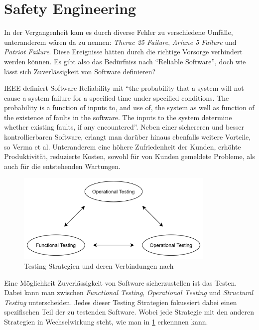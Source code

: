     \section{Safety Engineering}
        In der Vergangenheit kam es durch diverse Fehler zu verschiedene Umfälle, unteranderem wären da zu nennen:
        \textit{Therac 25 Failure}, \textit{Ariane 5 Failure} und \textit{Patriot Failure}. Diese Ereignisse hätten
        durch die richtige Vorsorge verhindert werden können.\cite[p. 185]{Verma2015} Es gibt also das Bedürfniss
        nach ``Reliable Software'', doch wie lässt sich Zuverlässigkeit von Software definieren?

        IEEE definiert Software Reliability mit ``the probability that a system will not cause a system failure
        for a specified time under specified conditions. The probability is a function of inputs to, and use of,
        the system as well as function of the existence of faults in the software. The inputs to the system
        determine whether existing faults, if any encountered''.\cite[p. 183]{Verma2015} Neben einer sichereren und
        besser kontrollierbaren Software, erlangt man darüber hinaus ebenfalls weitere Vorteile, so Verma et al.
        Unteranderem eine höhere Zufriedenheit der Kunden, erhöhte Produktivität, reduzierte Kosten, sowohl für
        von Kunden gemeldete Probleme, als auch für die entstehenden Wartungen.

        \begin{figure}[h]
            \begin{center}
                \includegraphics[width=0.85\textwidth]{figures/testing.png}
                \caption[Testing Strategies]{Testing Strategien und deren Verbindungen nach \cite{bertolino2019}}
                \label{pic:testing-strategies}
            \end{center}
        \end{figure}

        Eine Möglichkeit Zuverlässigkeit von Software sicherzustellen ist das Testen. Dabei kann man zwischen
        \textit{Functional Testing}, \textit{Operational Testing} und \textit{Structural Testing} unterscheiden.
        Jedes dieser Testing Strategien fokussiert dabei einen spezifischen Teil der zu testenden Software. \cite[p. 26]{bertolino2019}
        Wobei jede Strategie mit den anderen Strategien in Wechselwirkung steht, wie man in \ref{pic:testing-strategies}
        erkennnen kann.

